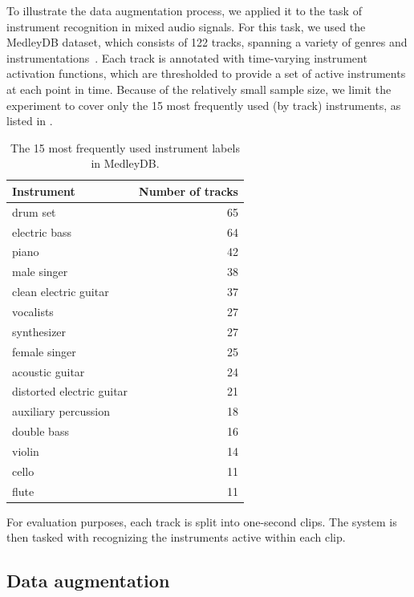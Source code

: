 \documentclass{article}
\begin{document}
To illustrate the data augmentation process, we applied it to the task of instrument
recognition in mixed audio signals.  For this task, we used the MedleyDB dataset, which
consists of 122 tracks, spanning a variety of genres and
instrumentations~\cite{bittner2014medleydb}.  Each track is annotated with time-varying
instrument activation functions, which are thresholded to provide a set of active
instruments at each point in time.
Because of the relatively small sample size, we limit
the experiment to cover only the 15 most frequently used (by track) instruments, as
listed in .

\begin{table}
\caption{The 15 most frequently used instrument labels in MedleyDB.\label{medleytags}}
\centering
\small
    \begin{tabular}{lr}
        \toprule
        Instrument & Number of tracks\\
        \midrule
        drum set                    & 65\\
        electric bass               & 64\\
        piano                       & 42 \\
        male singer                 & 38 \\
        clean electric guitar       & 37\\
        vocalists                   & 27\\
        synthesizer                 & 27\\
        female singer               & 25\\
        acoustic guitar             & 24\\
        distorted electric guitar   & 21\\
        auxiliary percussion        & 18\\
        double bass                 & 16\\
        violin                      & 14\\
        cello                       & 11\\
        flute                       & 11\\
        \bottomrule
    \end{tabular}
\end{table}

For evaluation purposes, each track is split into one-second clips.
The system is then tasked with recognizing the instruments active within each clip.

\subsection{Data augmentation}
\end{document}
